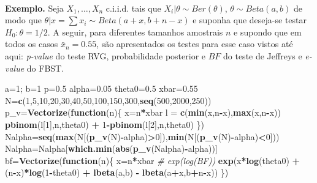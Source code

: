 \documentclass[
]{book}
\newenvironment{Shaded}{\begin{snugshade}}{\end{snugshade}}
\newcommand{\CommentTok}[1]{\textcolor[rgb]{0.56,0.35,0.01}{\textit{#1}}}
\newcommand{\ControlFlowTok}[1]{\textcolor[rgb]{0.13,0.29,0.53}{\textbf{#1}}}
\newcommand{\DecValTok}[1]{\textcolor[rgb]{0.00,0.00,0.81}{#1}}
\newcommand{\FloatTok}[1]{\textcolor[rgb]{0.00,0.00,0.81}{#1}}
\newcommand{\KeywordTok}[1]{\textcolor[rgb]{0.13,0.29,0.53}{\textbf{#1}}}
\newcommand{\NormalTok}[1]{#1}
\newcommand{\OperatorTok}[1]{\textcolor[rgb]{0.81,0.36,0.00}{\textbf{#1}}}
\newcommand{\StringTok}[1]{\textcolor[rgb]{0.31,0.60,0.02}{#1}}
\begin{document}
\(~\)

\textbf{Exemplo.} Seja \(X_1,\ldots,X_n\) c.i.i.d. tais que \(X_i|\theta \sim Ber(\theta)\), \(\theta \sim Beta(a,b)\) de modo que \(\theta|x=\sum x_i \sim Beta(a+x,b+n-x)\) e suponha que deseja-se testar \(H_0: \theta= 1/2\). A seguir, para diferentes tamanhos amostrais \(n\) e supondo que em todos os casos \(\bar{x}_n=0.55\), são apresentados os testes para esse caso vistos até aqui: \emph{p-value} do teste RVG, probabilidade posterior e \(BF\) do teste de Jeffreys e \emph{e-value} do FBST.

\begin{Shaded}
\begin{Highlighting}[]
\NormalTok{a=}\DecValTok{1}\NormalTok{; b=}\DecValTok{1}
\NormalTok{p=}\FloatTok{0.5}
\NormalTok{alpha=}\FloatTok{0.05}
\NormalTok{theta0=}\FloatTok{0.5}
\NormalTok{xbar=}\FloatTok{0.55}
\NormalTok{N=}\KeywordTok{c}\NormalTok{(}\DecValTok{1}\NormalTok{,}\DecValTok{5}\NormalTok{,}\DecValTok{10}\NormalTok{,}\DecValTok{20}\NormalTok{,}\DecValTok{30}\NormalTok{,}\DecValTok{40}\NormalTok{,}\DecValTok{50}\NormalTok{,}\DecValTok{100}\NormalTok{,}\DecValTok{150}\NormalTok{,}\DecValTok{300}\NormalTok{,}\KeywordTok{seq}\NormalTok{(}\DecValTok{500}\NormalTok{,}\DecValTok{2000}\NormalTok{,}\DecValTok{250}\NormalTok{))}
\NormalTok{p_v=}\KeywordTok{Vectorize}\NormalTok{(}\ControlFlowTok{function}\NormalTok{(n)\{}
\NormalTok{  x=n}\OperatorTok{*}\NormalTok{xbar}
\NormalTok{  l =}\StringTok{ }\KeywordTok{c}\NormalTok{(}\KeywordTok{min}\NormalTok{(x,n}\OperatorTok{-}\NormalTok{x),}\KeywordTok{max}\NormalTok{(x,n}\OperatorTok{-}\NormalTok{x))}
  \KeywordTok{pbinom}\NormalTok{(l[}\DecValTok{1}\NormalTok{],n,theta0) }\OperatorTok{+}\StringTok{ }\DecValTok{1}\OperatorTok{-}\KeywordTok{pbinom}\NormalTok{(l[}\DecValTok{2}\NormalTok{],n,theta0) \})}
\NormalTok{Nalpha=}\KeywordTok{seq}\NormalTok{(}\KeywordTok{max}\NormalTok{(N[(}\KeywordTok{p_v}\NormalTok{(N)}\OperatorTok{-}\NormalTok{alpha)}\OperatorTok{>}\DecValTok{0}\NormalTok{]),}\KeywordTok{min}\NormalTok{(N[(}\KeywordTok{p_v}\NormalTok{(N)}\OperatorTok{-}\NormalTok{alpha)}\OperatorTok{<}\DecValTok{0}\NormalTok{]))}
\NormalTok{Nalpha=Nalpha[}\KeywordTok{which.min}\NormalTok{(}\KeywordTok{abs}\NormalTok{(}\KeywordTok{p_v}\NormalTok{(Nalpha)}\OperatorTok{-}\NormalTok{alpha))]}
\NormalTok{bf=}\KeywordTok{Vectorize}\NormalTok{(}\ControlFlowTok{function}\NormalTok{(n)\{}
\NormalTok{  x=n}\OperatorTok{*}\NormalTok{xbar}
  \CommentTok{# exp(log(BF))}
  \KeywordTok{exp}\NormalTok{(x}\OperatorTok{*}\KeywordTok{log}\NormalTok{(theta0) }\OperatorTok{+}\StringTok{ }\NormalTok{(n}\OperatorTok{-}\NormalTok{x)}\OperatorTok{*}\KeywordTok{log}\NormalTok{(}\DecValTok{1}\OperatorTok{-}\NormalTok{theta0) }\OperatorTok{+}\StringTok{ }\KeywordTok{lbeta}\NormalTok{(a,b) }\OperatorTok{-}\StringTok{ }\KeywordTok{lbeta}\NormalTok{(a}\OperatorTok{+}\NormalTok{x,b}\OperatorTok{+}\NormalTok{n}\OperatorTok{-}\NormalTok{x)) \})}

\end{Highlighting}
\end{Shaded}
\end{document}
